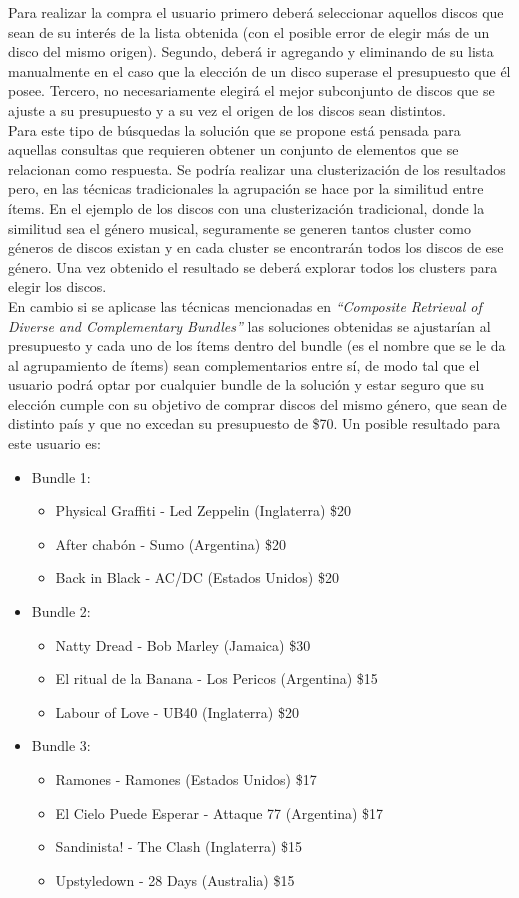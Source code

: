Para realizar la compra el usuario primero deberá seleccionar aquellos discos que sean de su interés de la lista obtenida (con el posible error de elegir más de un disco del mismo origen). Segundo, deberá ir agregando y eliminando de su lista manualmente en el caso que la elección de un disco superase el presupuesto que él posee. Tercero, no necesariamente elegirá el mejor subconjunto de discos que se ajuste a su presupuesto y a su vez el origen de los discos sean distintos.\\
Para este tipo de búsquedas la solución que se propone está pensada para aquellas consultas que requieren obtener un conjunto de elementos que se relacionan como respuesta. Se podría realizar una clusterización de los resultados pero, en las técnicas tradicionales la agrupación se hace por la similitud entre ítems. En el ejemplo de los discos con una clusterización tradicional, donde la similitud sea el género musical, seguramente se generen tantos cluster como géneros de discos existan y en cada cluster se encontrarán todos los discos de ese género. Una vez obtenido el resultado se deberá explorar todos los clusters para elegir los discos.\\
En cambio si se aplicase las técnicas mencionadas en \textit{``Composite Retrieval of Diverse and Complementary Bundles''} las soluciones obtenidas se ajustarían al presupuesto y cada uno de los ítems dentro del bundle (es el nombre que se le da al agrupamiento de ítems) sean complementarios entre sí, de modo tal que el usuario podrá optar por cualquier bundle de la solución y estar seguro que su elección cumple con su objetivo de comprar discos del mismo género, que sean de distinto país y que no excedan su presupuesto de \$70. Un posible resultado para este usuario es:
\begin{itemize}
  \item Bundle 1:
  \begin{itemize}
    \item Physical Graffiti - Led Zeppelin (Inglaterra) \$20
    \item After chabón - Sumo (Argentina) \$20
    \item Back in Black - AC/DC (Estados Unidos) \$20
  \end{itemize}
  \item Bundle 2:
  \begin{itemize}
    \item Natty Dread - Bob Marley (Jamaica) \$30
    \item El ritual de la Banana - Los Pericos (Argentina) \$15
    \item Labour of Love - UB40 (Inglaterra) \$20
  \end{itemize}
	  \item Bundle 3:
  \begin{itemize}
    \item Ramones - Ramones (Estados Unidos) \$17
    \item El Cielo Puede Esperar - Attaque 77 (Argentina) \$17
    \item Sandinista! - The Clash (Inglaterra) \$15
		\item Upstyledown - 28 Days (Australia) \$15
  \end{itemize}
\end{itemize}
